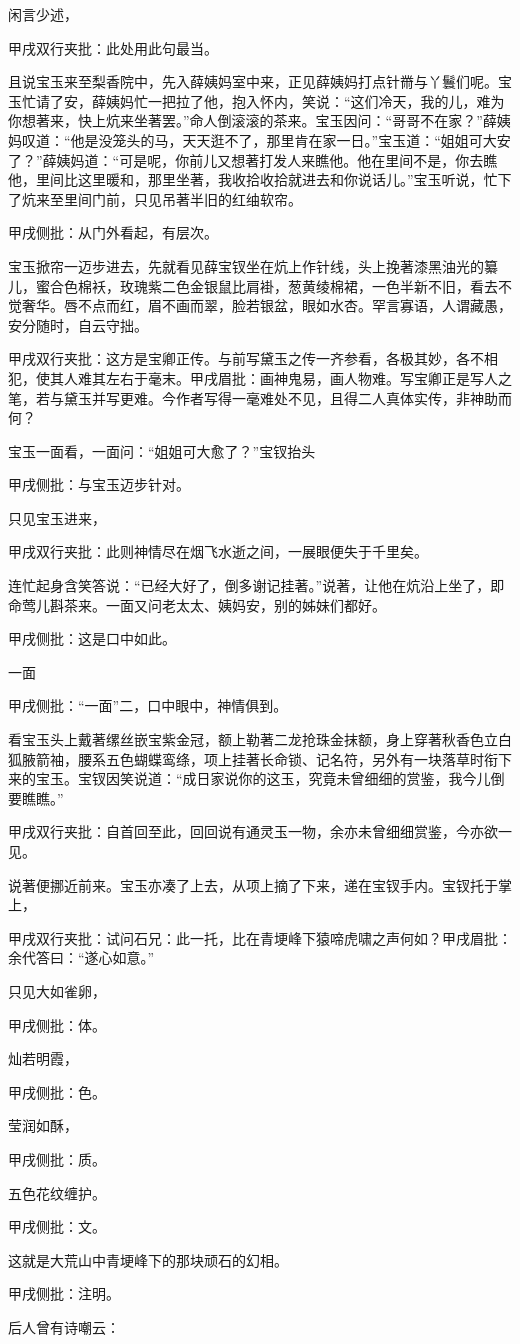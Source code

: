 \begin{parag}
    闲言少述，\begin{note}甲戌双行夹批：此处用此句最当。\end{note}且说宝玉来至梨香院中，先入薛姨妈室中来，正见薛姨妈打点针黹与丫鬟们呢。宝玉忙请了安，薛姨妈忙一把拉了他，抱入怀内，笑说：“这们冷天，我的儿，难为你想著来，快上炕来坐著罢。”命人倒滚滚的茶来。宝玉因问：“哥哥不在家？”薛姨妈叹道：“他是没笼头的马，天天逛不了，那里肯在家一日。”宝玉道：“姐姐可大安了？”薛姨妈道：“可是呢，你前儿又想著打发人来瞧他。他在里间不是，你去瞧他，里间比这里暖和，那里坐著，我收拾收拾就进去和你说话儿。”宝玉听说，忙下了炕来至里间门前，只见吊著半旧的红䌷软帘。\begin{note}甲戌侧批：从门外看起，有层次。\end{note}宝玉掀帘一迈步进去，先就看见薛宝钗坐在炕上作针线，头上挽著漆黑油光的纂儿，蜜合色棉袄，玫瑰紫二色金银鼠比肩褂，葱黄绫棉裙，一色半新不旧，看去不觉奢华。唇不点而红，眉不画而翠，脸若银盆，眼如水杏。罕言寡语，人谓藏愚，安分随时，自云守拙。\begin{note}甲戌双行夹批：这方是宝卿正传。与前写黛玉之传一齐参看，各极其妙，各不相犯，使其人难其左右于毫末。甲戌眉批：画神鬼易，画人物难。写宝卿正是写人之笔，若与黛玉并写更难。今作者写得一毫难处不见，且得二人真体实传，非神助而何？\end{note}宝玉一面看，一面问：“姐姐可大愈了？”宝钗抬头\begin{note}甲戌侧批：与宝玉迈步针对。\end{note}只见宝玉进来，\begin{note}甲戌双行夹批：此则神情尽在烟飞水逝之间，一展眼便失于千里矣。\end{note}连忙起身含笑答说：“已经大好了，倒多谢记挂著。”说著，让他在炕沿上坐了，即命莺儿斟茶来。一面又问老太太、姨妈安，别的姊妹们都好。\begin{note}甲戌侧批：这是口中如此。\end{note}一面\begin{note}甲戌侧批：“一面”二，口中眼中，神情俱到。\end{note}看宝玉头上戴著缧丝嵌宝紫金冠，额上勒著二龙抢珠金抹额，身上穿著秋香色立白狐腋箭袖，腰系五色蝴蝶鸾绦，项上挂著长命锁、记名符，另外有一块落草时衔下来的宝玉。宝钗因笑说道：“成日家说你的这玉，究竟未曾细细的赏鉴，我今儿倒要瞧瞧。”\begin{note}甲戌双行夹批：自首回至此，回回说有通灵玉一物，余亦未曾细细赏鉴，今亦欲一见。\end{note}说著便挪近前来。宝玉亦凑了上去，从项上摘了下来，递在宝钗手内。宝钗托于掌上，\begin{note}甲戌双行夹批：试问石兄：此一托，比在青埂峰下猿啼虎啸之声何如？甲戌眉批：余代答曰：“遂心如意。”\end{note}只见大如雀卵，\begin{note}甲戌侧批：体。\end{note}灿若明霞，\begin{note}甲戌侧批：色。\end{note}莹润如酥，\begin{note}甲戌侧批：质。\end{note}五色花纹缠护。\begin{note}甲戌侧批：文。\end{note}这就是大荒山中青埂峰下的那块顽石的幻相。\begin{note}甲戌侧批：注明。\end{note}后人曾有诗嘲云：
\end{parag}


